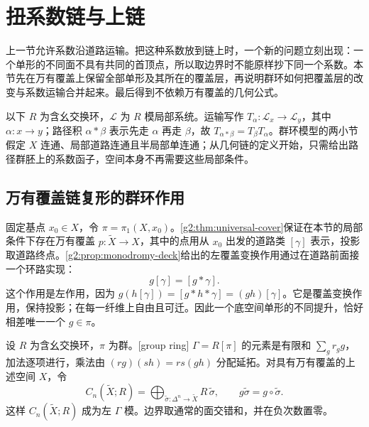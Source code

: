 
% 
% 

\section{扭系数链与上链}
\label{g2:sec:0502}

上一节允许系数沿道路运输。把这种系数放到链上时，一个新的问题立刻出现：一个单形的不同面不具有共同的首顶点，所以取边界时不能原样抄下同一个系数。本节先在万有覆盖上保留全部单形及其所在的覆盖层，再说明群环如何把覆盖层的改变与系数运输合并起来。最后得到不依赖万有覆盖的几何公式。

\ProseParagraphBreak

以下 \(R\) 为含幺交换环，\(\mathcal L\) 为 \(R\) 模局部系统。运输写作 \(T_\alpha:\mathcal L_x\to\mathcal L_y\)，其中 \(\alpha:x\to y\)；路径积 \(\alpha*\beta\) 表示先走 \(\alpha\) 再走 \(\beta\)，故 \(T_{\alpha*\beta}=T_\beta T_\alpha\)。群环模型的两小节假定 \(X\) 连通、局部道路连通且半局部单连通；从几何链的定义开始，只需给出路径群胚上的系数函子，空间本身不再需要这些局部条件。

\subsection{万有覆盖链复形的群环作用}
\label{g2:subsec:0502:01}
固定基点 \(x_0\in X\)，令 \(\pi=\pi_1(X,x_0)\)。\cref{g2:thm:universal-cover}保证在本节的局部条件下存在万有覆盖 \(p:\widetilde X\to X\)，其中的点用从 \(x_0\) 出发的道路类 \([\gamma]\) 表示，投影取道路终点。\cref{g2:prop:monodromy-deck}给出的左覆盖变换作用通过在道路前面接一个环路实现：
\[
	g[\gamma]=[g*\gamma].
\]
这个作用是左作用，因为 \(g(h[\gamma])=[g*h*\gamma]=(gh)[\gamma]\)。它是覆盖变换作用，保持投影；在每一纤维上自由且可迁。因此一个底空间单形的不同提升，恰好相差唯一一个 \(g\in\pi\)。

\begin{definition}\label{g2:def:cover-chain-module}
	设 \(R\) 为含幺交换环，\(\pi\) 为群。[group ring] \(\Gamma=R[\pi]\) 的元素是有限和 \(\sum_g r_g g\)，加法逐项进行，乘法由 \((rg)(sh)=rs(gh)\) 分配延拓。对具有万有覆盖的上述空间 \(X\)，令
	\[
		C_n(\widetilde X;R)=\bigoplus_{\widetilde\sigma:\Delta^n\to\widetilde X}R\,\widetilde\sigma,
		\qquad g\widetilde\sigma=g\circ\widetilde\sigma.
	\]
	这样 \(C_n(\widetilde X;R)\) 成为左 \(\Gamma\) 模。边界取通常的面交错和，并在负次数置零。
\end{definition}

